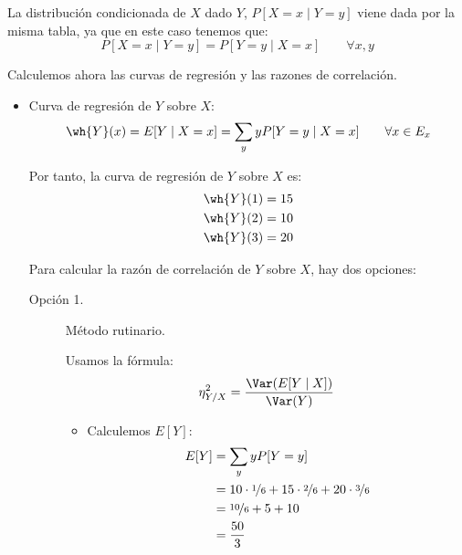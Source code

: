 \begin{ejercicio}
\begin{enumerate}
        La distribución condicionada de $X$ dado $Y$, $P[X = x\mid Y = y]$ viene dada por la misma tabla, ya que en este caso tenemos que:
        \begin{equation*}
            P[X = x\mid Y = y] = P[Y = y\mid X = x] \qquad \forall x, y
        \end{equation*}

        Calculemos ahora las curvas de regresión y las razones de correlación.
        \begin{itemize}
            \item Curva de regresión de $Y$ sobre $X$:
            \begin{equation*}
                \wh{Y}(x) = E[Y\mid X = x] = \sum_{y} y P[Y = y\mid X = x] \qquad \forall x\in E_x
            \end{equation*}
    
            Por tanto, la curva de regresión de $Y$ sobre $X$ es:
            \begin{align*}
                \wh{Y}(1) &= 15\\
                \wh{Y}(2) &= 10\\
                \wh{Y}(3) &= 20
            \end{align*}

            Para calcular la razón de correlación de $Y$ sobre $X$,
            hay dos opciones:
            \begin{description}
                \item[Opción 1.] Método rutinario.
                
                Usamos la fórmula:
                \begin{equation*}
                    \eta^2_{Y/X} = \dfrac{\Var(E[Y\mid X])}{\Var(Y)}
                \end{equation*}
                \begin{itemize}
                    \item Calculemos $E[Y]$:
                    \begin{align*}
                        E[Y] &= \sum_{y} y P[Y = y]\\
                        &= 10 \cdot \nicefrac{1}{6} + 15 \cdot \nicefrac{2}{6} + 20 \cdot \nicefrac{3}{6}\\
                        &= \nicefrac{10}{6} + 5 + 10\\
                        &= \frac{50}{3}
                    \end{align*}


\end{itemize}
\end{description}
\end{itemize}
\end{enumerate}
\end{ejercicio}
